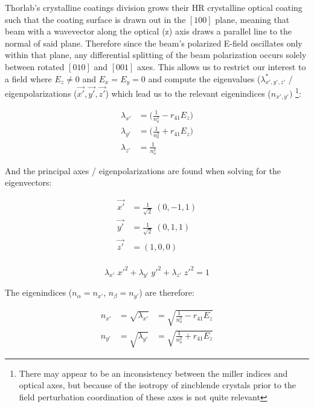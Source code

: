 \noindent Thorlab's crystalline coatings division grows their HR crystalline optical coating such that the coating surface is drawn out in the $[100]$ plane, meaning that beam with a wavevector along the optical (z) axis draws a parallel line to the normal of said plane. Therefore since the beam's polarized E-field oscillates only within that plane, any differential splitting of the beam polarization occurs solely between rotated $[010]$ and $[001]$ axes. This allows us to restrict our interest to a field where $E_{z} \neq 0$ and $E_x = E_y =0$ and compute the eigenvalues ($\lambda^{*}_{x',y',z'}$ / eigenpolarizations ($\vec{x'}, \vec{y'}, \vec{z'}$) which lead us to the relevant eigenindices ($n_{x',y'})$ \footnote{There may appear to be an inconsistency between the miller indices and optical axes, but because of the isotropy of zincblende crystals prior to the field perturbation coordination of these axes is not quite relevant}:

\begin{equation}
    \begin{aligned}
    	\lambda_{x'} & = \big( \frac{1}{n_o ^2} - r_{41} E_z \big) \\
	\lambda_{y'} & = \big( \frac{1}{n_o ^2} + r_{41} E_z \big) \\
	\lambda_{z'} &  = \frac{1}{n_o ^2}
    \end{aligned}
\end{equation}

\noindent And the principal axes / eigenpolarizations are found when solving for the eigenvectors:

\begin{equation}
    \begin{aligned}
	\vec{x'} & = \frac{1}{\sqrt{2}}\;(0, -1, 1) \\ 
	\vec{y'} & = \frac{1}{\sqrt{2}}\;(0, 1, 1) \\
	\vec{z'} & = (1, 0, 0) \\
    \end{aligned}
\end{equation}

\begin{equation}
    \lambda_{x'}\; x'^2 + \lambda_{y'}\; y'^2 + \lambda_{z'}\; z'^2 =1
\end{equation}

\noindent The eigenindices ($n_\alpha = n_{x'}$, $n_\beta = n_{y'}$) are therefore:

\begin{equation}
    \begin{aligned}
	n_{x'} & = \sqrt{\lambda_{x'}} & = \sqrt{\frac{1}{n_o ^2} - r_{41} E_z} \\
	n_{y'} & = \sqrt{\lambda_{y'}} & =  \sqrt{\frac{1}{n_o ^2} + r_{41} E_z}
    \end{aligned}
\end{equation}



